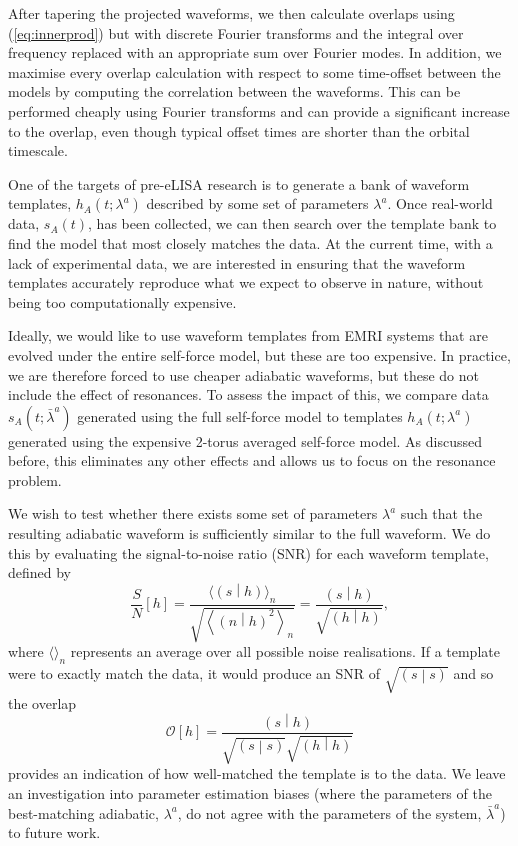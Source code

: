 \documentclass[aps,prd,amsfonts,amssymb,amsmath,nofootinbib,reprint,showpacs]{revtex4}
\newcommand{\eqnref}[1]{(\ref{eq:#1})}
\newcommand{\overlap}[2]{\ensuremath{\left(#1\middle|#2\right)}}
\begin{document}
After tapering the projected waveforms, we then calculate overlaps using \eqnref{innerprod} but with discrete Fourier transforms and the integral over frequency replaced with an appropriate sum over Fourier modes. In addition, we maximise every overlap calculation with respect to some time-offset between the models by computing the correlation between the waveforms. This can be performed cheaply using Fourier transforms and can provide a significant increase to the overlap, even though typical offset times are shorter than the orbital timescale.


One of the targets of pre-eLISA research is to generate a bank of waveform templates, $h_A(t;\lambda^a)$ described by some set of parameters $\lambda^a$. Once real-world data, $s_A(t)$, has been collected, we can then search over the template bank to find the model that most closely matches the data. At the current time, with a lack of experimental data, we are interested in ensuring that the waveform templates accurately reproduce what we expect to observe in nature, without being too computationally expensive.

Ideally, we would like to use waveform templates from EMRI systems that are evolved under the entire self-force model, but these are too expensive. In practice, we are therefore forced to use cheaper adiabatic waveforms, but these do not include the effect of resonances. To assess the impact of this, we compare data $s_A(t;\bar{\lambda}^a)$ generated using the full self-force model to templates $h_A(t;\lambda^a)$ generated using the expensive 2-torus averaged self-force model. As discussed before, this eliminates any other effects and allows us to focus on the resonance problem.

We wish to test whether there exists some set of parameters $\lambda^a$ such that the resulting adiabatic waveform is sufficiently similar to the full waveform. We do this by evaluating the signal-to-noise ratio (SNR) for each waveform template, defined by
\begin{equation}
\frac{S}{N}\left[h\right] = \frac{\langle\overlap{s}{h}\rangle_n}{\sqrt{\left\langle\overlap{n}{h}^2\right\rangle_n}} = \frac{\overlap{s}{h}}{\sqrt{\overlap{h}{h}}},
\end{equation}
where $\langle\rangle_n$ represents an average over all possible noise realisations. If a template were to exactly match the data, it would produce an SNR of $\sqrt{\overlap{s}{s}}$ and so the overlap
\begin{equation}
\label{eq:overlap}
\mathcal{O}\left[h\right] = \frac{\overlap{s}{h}}{\sqrt{\overlap{s}{s}}\sqrt{\overlap{h}{h}}}
\end{equation}
provides an indication of how well-matched the template is to the data. We leave an investigation into parameter estimation biases (where the parameters of the best-matching adiabatic, $\lambda^a$, do not agree with the parameters of the system, $\bar{\lambda}^a$) to future work.
\end{document}
